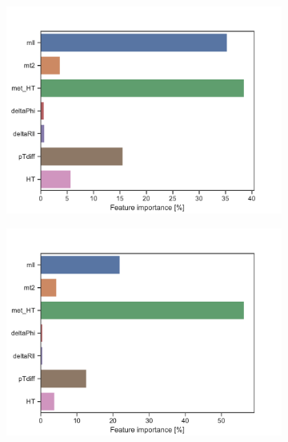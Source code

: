 \begin{figure}[H]
    \centering
    \begin{subfigure}[t!]{0.49\textwidth}
        \includegraphics[width = \textwidth]{Figures/SlepSlep/ML/BDT/High_level/Low/featureImportance.pdf}
        \caption{}
        \label{fig:featSlepslepLow}
    \end{subfigure}
    \begin{subfigure}[t!]{0.49\textwidth}
        \includegraphics[width = \textwidth]{Figures/SlepSnu/BDT/High_level/Low/featureImportance.pdf}
        \caption{}
        \label{fig:featSlepsnuLow}
    \end{subfigure}
    \begin{subfigure}[t!]{0.49\textwidth}

\end{subfigure}
\end{figure}
